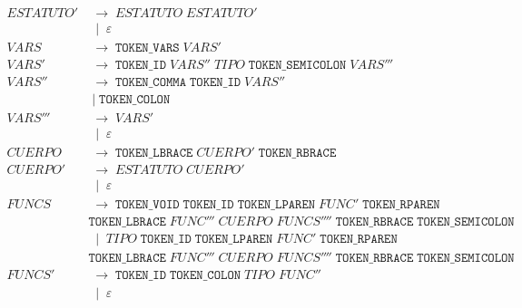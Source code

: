 \documentclass[12pt, letterpaper]{article}
\theoremstyle{definition}
\newcommand{\produce}{\;\longrightarrow\;}
\newcommand{\OR}{\;\mid\;}
\begin{document}
{\begin{align}
    \mathit{ESTATUTO'} &\produce \mathit{ESTATUTO}\; \mathit{ESTATUTO'} \\
                      & \OR \varepsilon \nonumber \\[3pt]                                            
    \mathit{VARS} &\produce \texttt{TOKEN\_VARS}\; \mathit{VARS'}\;  \\[3pt]
    \mathit{VARS'} &\produce \texttt{TOKEN\_ID}\; \mathit{VARS''}\; \mathit{TIPO}\;\texttt{TOKEN\_SEMICOLON}\;  \mathit{VARS'''} \\[3pt]
    \mathit{VARS''}  &\produce \texttt{TOKEN\_COMMA}\; \texttt{TOKEN\_ID}\; \mathit{VARS''}\\
                     &\OR \texttt{TOKEN\_COLON} \nonumber\\[3pt]
    \mathit{VARS'''}  &\produce \mathit{VARS'}\\
                     &\OR \varepsilon \nonumber \\[3pt]    
    \mathit{CUERPO} &\produce  \texttt{TOKEN\_LBRACE}\; \mathit{CUERPO'} \; \texttt{TOKEN\_RBRACE}\; \\[3pt]
    \mathit{CUERPO'} &\produce \mathit{ESTATUTO} \;\mathit{CUERPO'} \\ 
                     & \OR \varepsilon \nonumber\\[3pt]
    \mathit{FUNCS} &\produce \texttt{TOKEN\_VOID}\; \texttt{TOKEN\_ID}\;\texttt{TOKEN\_LPAREN}\;  \mathit{FUNC'}\; 
                    \texttt{TOKEN\_RPAREN}\; \\ 
                   &\texttt{TOKEN\_LBRACE} \; \mathit{FUNC'''} \;
                     \mathit{CUERPO} \; \mathit{FUNCS''''} \;   \texttt{TOKEN\_RBRACE} \; \texttt{TOKEN\_SEMICOLON} \; \nonumber\\
                   &\OR{}  \mathit{TIPO}\; \texttt{TOKEN\_ID}\;\texttt{TOKEN\_LPAREN}\;  \mathit{FUNC'}\; 
                    \texttt{TOKEN\_RPAREN}\; \nonumber\\
                   &\texttt{TOKEN\_LBRACE} \; \mathit{FUNC'''} \;
                     \mathit{CUERPO} \;  \mathit{FUNCS''''} \;  \texttt{TOKEN\_RBRACE} \; \texttt{TOKEN\_SEMICOLON} \; \nonumber\\[3pt]
    \mathit{FUNCS'} &\produce \texttt{TOKEN\_ID}\;\texttt{TOKEN\_COLON}\;\mathit{TIPO}\; \mathit{FUNC''}\;  \\
                   & \OR \varepsilon \nonumber \\[3pt] \nonumber
\end{align}

}
\end{document}
